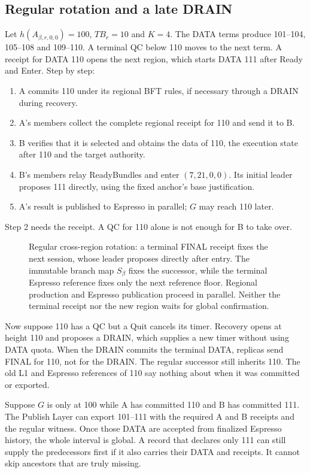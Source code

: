 \documentclass[11pt,a4paper]{article}
\newcommand{\TB}{\mathit{TB}}
\begin{document}
\subsection{Regular rotation and a late DRAIN}
\label{sec:regular-example}
Let $h(A_{\beta,r,0,0})=100$, $\TB_r=10$ and $K=4$. The DATA terms produce
101--104, 105--108 and 109--110. A terminal QC below 110 moves to the next
term. A receipt for DATA 110 opens the next region, which starts DATA 111
after Ready and Enter. Step by step:
\begin{enumerate}
\item A commits 110 under its regional BFT rules, if necessary through a
DRAIN during recovery.
\item A's members collect the complete regional receipt for 110 and send
it to B.
\item B verifies that it is selected and obtains the data of 110, the
execution state after 110 and the target authority.
\item B's members relay ReadyBundles and enter $(7,21,0,0)$.
Its initial leader proposes 111 directly, using the fixed anchor's
base justification.
\item A's result is published to Espresso in parallel; $G$ may reach 110
later.
\end{enumerate}
Step 2 needs the receipt. A QC for 110 alone is not enough for B to take
over.

\begin{figure}[htbp]\centering

\caption{Regular cross-region rotation: a terminal FINAL receipt fixes
the next session, whose leader proposes directly after entry. The immutable branch map $S_\beta$ fixes the successor, while
the terminal Espresso reference fixes only the next reference floor.
Regional production and Espresso publication proceed in parallel. Neither
the terminal receipt nor the new region waits for global confirmation.}
\label{fig:regular-cross-region}
\end{figure}
\FloatBarrier

Now suppose 110 has a QC but a Quit cancels its timer. Recovery opens at
height 110 and proposes a DRAIN, which supplies a new timer without using
DATA quota. When the DRAIN commits the terminal DATA, replicas send FINAL
for 110, not for the DRAIN. The regular successor still inherits 110. The
old L1 and Espresso references of 110 say nothing about when it was
committed or exported.

Suppose $G$ is only at 100 while A has committed 110 and B has committed
111. The Publish Layer can export 101--111 with the required A and B
receipts and the regular witness. Once those DATA are accepted from
finalized Espresso history, the whole interval is global. A record that
declares only 111 can still supply the predecessors first if it also
carries their DATA and receipts. It cannot skip ancestors that are truly
missing.
\end{document}
